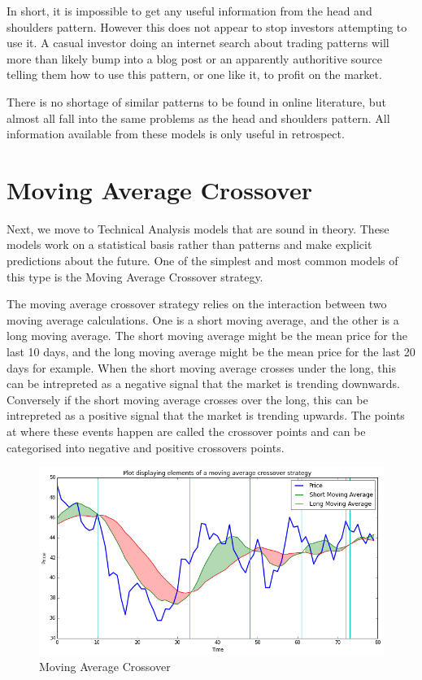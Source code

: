\documentclass{report}
\begin{document}
In short, it is impossible to get any useful information from the head and shoulders pattern. However this does not appear to stop investors attempting to use it. A casual investor doing an internet search about trading patterns will more than likely bump into a blog post or an apparently authoritive source telling them how to use this pattern, or one like it, to profit on the market. 

There is no shortage of similar patterns to be found in online literature, but almost all fall into the same problems as the head and shoulders pattern. All information available from these models is only useful in retrospect. 

\section{Moving Average Crossover}

Next, we move to Technical Analysis models that are sound in theory. These models work on a statistical basis rather than patterns and make explicit predictions about the future. One of the simplest and most common models of this type is the Moving Average Crossover strategy.

The moving average crossover strategy relies on the interaction between two moving average calculations. One is a short moving average, and the other is a long moving average. The short moving average might be the mean price for the last 10 days, and the long moving average might be the mean price for the last 20 days for example. When the short moving average crosses under the long, this can be intrepreted as a negative signal that the market is trending downwards. Conversely if the short moving average crosses over the long, this can be intrepreted as a positive signal that the market is trending upwards. The points at where these events happen are called the crossover points and can be categorised into negative and positive crossovers points.

\begin{figure}[H]
	\caption{Moving Average Crossover}
	\centerline{\includegraphics[width=\textwidth]{vis/macrossover.png}}
	\label{fig:macrossover}
\end{figure}
\end{document}
